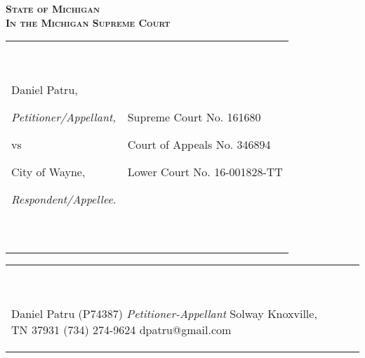 \documentclass[12pt,\documentclassflag]{michiganCourtOfAppealsBrief}
\begin{document}
\begin{centering}
\bf\scshape State of Michigan\\In the Michigan Supreme Court

\rm 

\makeandtab
\setlength{\tabcolsep}{20pt}%
\begin{tabular}{p{} p{}}
  {~

  \raggedright Daniel Patru,\par
  \hspace{20pt}\textit{Petitioner/Appellant,}\par
  \vspace{.5\baselineskip}\par
  vs\par
  \vspace{.5\baselineskip}
  \raggedright City of Wayne,\par
  \hspace{20pt}\textit{Respondent/Appellee.}
  
  ~} &  {~
       \par\par
       Supreme Court No. 161680\par
       Court of Appeals No. 346894\par
       Lower Court No. 16-001828-TT\par\vspace{\baselineskip}

  ~}
  \\ \cline{1-2}\vspace{2mm}\\
\end{tabular}
\begin{tabular}{p{} p{}}
  {~ 
  
  Daniel Patru (P74387) \newline%
  \emph{Petitioner-Appellant}\newline
  3309 Solway\newline%
  Knoxville, TN 37931\newline%
  (734) 274-9624\newline%
  dpatru@gmail.com\newline\newline%
  ~} & {~ %
       
}
\end{tabular}
\end{centering}
\end{document}
